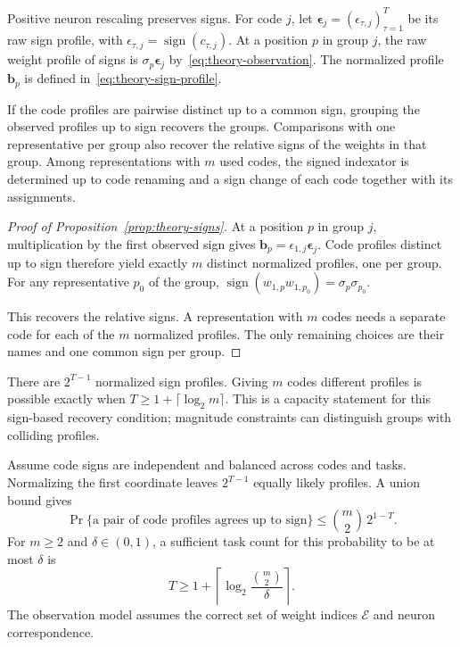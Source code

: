 Positive neuron rescaling preserves signs. For code $j$, let
$\boldsymbol\epsilon_j=(\epsilon_{\tau,j})_{\tau=1}^T$ be its raw
sign profile, with $\epsilon_{\tau,j}=\operatorname{sign}(c_{\tau,j})$.
At a position $p$ in group $j$, the raw weight profile of signs is
$\sigma_p\boldsymbol\epsilon_j$ by~\eqref{eq:theory-observation}.
The normalized profile $\mathbf b_p$ is defined in~\eqref{eq:theory-sign-profile}.

\begin{proposition}
    \label{prop:theory-signs}
    If the code profiles are pairwise distinct up to a common sign,
    grouping the observed profiles up to sign recovers the groups.
    Comparisons with one representative per group also recover the
    relative signs of the weights in that group.
    Among representations with $m$ used codes, the signed indexator
    is determined up to code renaming and a sign change of each code
    together with its assignments.
\end{proposition}

\begin{proof}[Proof of Proposition~\ref{prop:theory-signs}]
    At a position $p$ in group $j$, multiplication by the first
    observed sign gives
    $\mathbf b_p=\epsilon_{1,j}\boldsymbol\epsilon_j$.
    Code profiles distinct up to sign therefore yield exactly $m$
    distinct normalized profiles, one per group. For any representative
    $p_0$ of the group,
    $\operatorname{sign}(w_{1,p}w_{1,p_0})=\sigma_p\sigma_{p_0}$.

    This recovers the relative signs. A representation with $m$
    codes needs a separate code for each of the $m$ normalized
    profiles. The only remaining choices are their names and
    one common sign per group.
\end{proof}

There are $2^{T-1}$ normalized sign profiles. Giving $m$ codes
different profiles is possible exactly when
$T\ge1+\lceil\log_2m\rceil$.
This is a capacity statement for this sign-based recovery condition;
magnitude constraints can distinguish groups with colliding profiles.

Assume code signs are independent and balanced across codes and
tasks. Normalizing the first coordinate leaves $2^{T-1}$ equally
likely profiles. A union bound gives
\begin{equation}
    \Pr\{\text{a pair of code profiles agrees up to sign}\}
    \le \binom m2\,2^{1-T}.
    \label{eq:appendix-theory-sign-collisions}
\end{equation}
For $m\ge2$ and $\delta\in(0,1)$, a sufficient task count for this
probability to be at most $\delta$ is
\begin{equation*}
    T\ge1+\left\lceil
        \log_2\frac{\binom m2}{\delta}
        \right\rceil.
\end{equation*}
The observation model assumes the correct set of weight indices
$\mathcal E$ and neuron correspondence.

